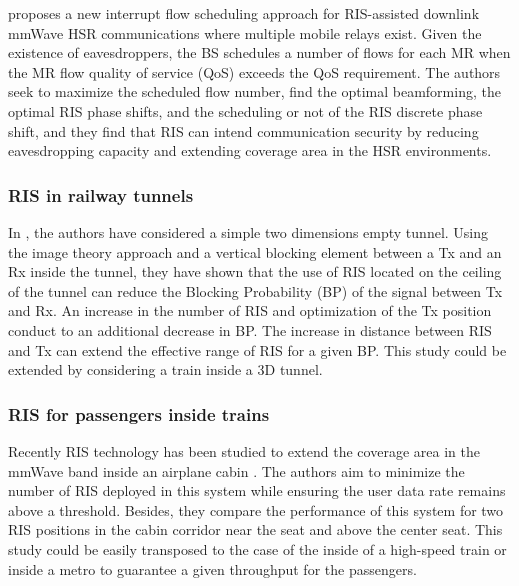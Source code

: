 \documentclass[conference]{IEEEtran}
\begin{document}
\cite{9933649}  proposes a new interrupt flow scheduling approach for RIS-assisted downlink mmWave HSR communications where multiple mobile relays exist. Given the existence of eavesdroppers, the BS schedules a  number of flows for each MR when the MR flow quality of service (QoS) exceeds the QoS requirement. The authors seek to maximize the scheduled flow number, find the optimal beamforming, the optimal RIS phase shifts, and the scheduling or not of the RIS discrete phase shift, and they find that RIS can intend communication security by reducing eavesdropping capacity and extending coverage area in the HSR environments.%



\subsubsection{RIS in railway tunnels}
In \cite{Chen2022}, the authors have considered a simple two dimensions empty tunnel. Using the image theory approach and a vertical blocking element between a Tx and an Rx inside the tunnel, they have shown that the use of RIS located on the ceiling of the tunnel can reduce the Blocking Probability (BP) of the signal between Tx 
and Rx. %
An increase in the number of RIS %
and optimization of the Tx position conduct to an additional decrease in BP. The increase in
distance between RIS and Tx can extend the effective range of RIS for a given BP. This study could be extended by considering a train inside a 3D tunnel.

\subsubsection {RIS for passengers inside trains}
  Recently RIS technology has been studied to extend the coverage area in the mmWave band inside an airplane cabin \cite{li2023mmwave}. The authors aim to  minimize the number of RIS deployed in this system while ensuring the user data rate remains above a threshold. Besides, they compare the performance of this system for two RIS positions in the cabin corridor near the seat and above the center seat. This study could be easily transposed to the case of the inside of a high-speed train or inside a metro to guarantee a given throughput for the passengers.
\end{document}
